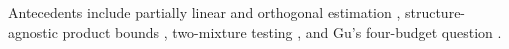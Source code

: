 Antecedents include partially linear and orthogonal estimation
\citep{robinson1988root,chernozhukov2018doubledebiased,foster2023orthogonal},
structure-agnostic product bounds \citep{balakrishnan2023fundamentalstructureagnostic},
two-mixture testing \citep{robins2009semiparametric}, and Gu's four-budget
question \citep{gu2025structureagnosticplm}.
